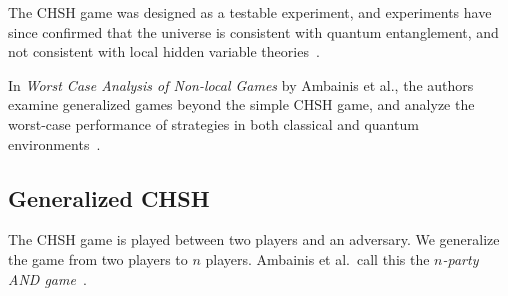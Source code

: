 The CHSH game was designed as a testable experiment, and experiments have since confirmed that the universe is consistent with quantum entanglement, and not consistent with local hidden variable theories~\cite{aspect}.

In \emph{Worst Case Analysis of Non-local Games} by Ambainis et al., the authors examine generalized games beyond the simple CHSH game, and analyze the worst-case performance of strategies in both classical and quantum environments~\cite{ABBSSV}.

\subsection{Generalized CHSH}

The CHSH game is played between two players and an adversary. We generalize the game from two players to $n$ players. Ambainis et al.~call this the \emph{$n$-party AND game}~\cite{ABBSSV}.



